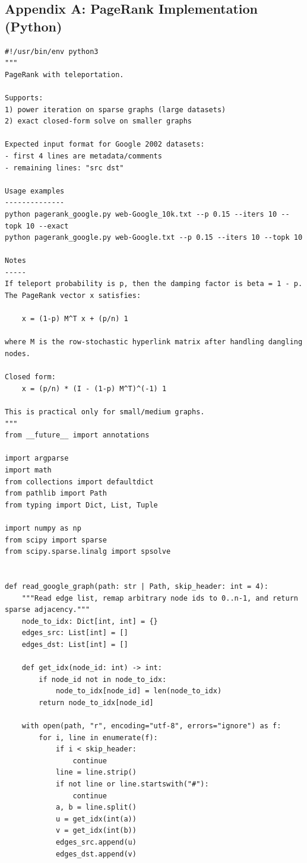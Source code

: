 \documentclass[12pt]{article}
\begin{document}
\subsection{Appendix A: PageRank Implementation (Python)}

\begin{lstlisting}[style=pythonstyle]
#!/usr/bin/env python3
"""
PageRank with teleportation.

Supports:
1) power iteration on sparse graphs (large datasets)
2) exact closed-form solve on smaller graphs

Expected input format for Google 2002 datasets:
- first 4 lines are metadata/comments
- remaining lines: "src dst"

Usage examples
--------------
python pagerank_google.py web-Google_10k.txt --p 0.15 --iters 10 --topk 10 --exact
python pagerank_google.py web-Google.txt --p 0.15 --iters 10 --topk 10

Notes
-----
If teleport probability is p, then the damping factor is beta = 1 - p.
The PageRank vector x satisfies:

    x = (1-p) M^T x + (p/n) 1

where M is the row-stochastic hyperlink matrix after handling dangling nodes.

Closed form:
    x = (p/n) * (I - (1-p) M^T)^(-1) 1

This is practical only for small/medium graphs.
"""
from __future__ import annotations

import argparse
import math
from collections import defaultdict
from pathlib import Path
from typing import Dict, List, Tuple

import numpy as np
from scipy import sparse
from scipy.sparse.linalg import spsolve


def read_google_graph(path: str | Path, skip_header: int = 4):
    """Read edge list, remap arbitrary node ids to 0..n-1, and return sparse adjacency."""
    node_to_idx: Dict[int, int] = {}
    edges_src: List[int] = []
    edges_dst: List[int] = []

    def get_idx(node_id: int) -> int:
        if node_id not in node_to_idx:
            node_to_idx[node_id] = len(node_to_idx)
        return node_to_idx[node_id]

    with open(path, "r", encoding="utf-8", errors="ignore") as f:
        for i, line in enumerate(f):
            if i < skip_header:
                continue
            line = line.strip()
            if not line or line.startswith("#"):
                continue
            a, b = line.split()
            u = get_idx(int(a))
            v = get_idx(int(b))
            edges_src.append(u)
            edges_dst.append(v)


\end{lstlisting}
\end{document}
